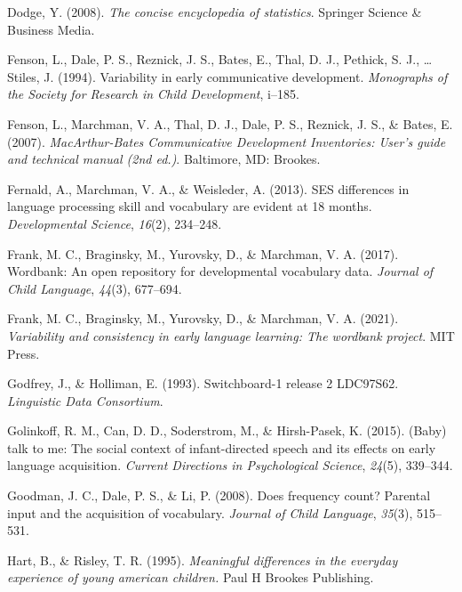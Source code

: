 \documentclass[10pt, letterpaper]{article}
\newenvironment{CSLReferences}%
  {}%
  {\par}
\begin{document}
\begin{CSLReferences}{1}{0}
\leavevmode{}%
Dodge, Y. (2008). \emph{The concise encyclopedia of statistics}.
Springer Science \& Business Media.

\leavevmode{}%
Fenson, L., Dale, P. S., Reznick, J. S., Bates, E., Thal, D. J.,
Pethick, S. J., \ldots{} Stiles, J. (1994). Variability in early
communicative development. \emph{Monographs of the Society for Research
in Child Development}, i--185.

\leavevmode{}%
Fenson, L., Marchman, V. A., Thal, D. J., Dale, P. S., Reznick, J. S.,
\& Bates, E. (2007). \emph{{M}ac{A}rthur-{B}ates {C}ommunicative
{D}evelopment {I}nventories: User's guide and technical manual (2nd
ed.)}. Baltimore, MD: Brookes.

\leavevmode{}%
Fernald, A., Marchman, V. A., \& Weisleder, A. (2013). SES differences
in language processing skill and vocabulary are evident at 18 months.
\emph{Developmental Science}, \emph{16}(2), 234--248.

\leavevmode{}%
Frank, M. C., Braginsky, M., Yurovsky, D., \& Marchman, V. A. (2017).
Wordbank: An open repository for developmental vocabulary data.
\emph{Journal of Child Language}, \emph{44}(3), 677--694.

\leavevmode{}%
Frank, M. C., Braginsky, M., Yurovsky, D., \& Marchman, V. A. (2021).
\emph{Variability and consistency in early language learning: The
wordbank project}. MIT Press.

\leavevmode{}%
Godfrey, J., \& Holliman, E. (1993). Switchboard-1 release 2 LDC97S62.
\emph{Linguistic Data Consortium}.

\leavevmode{}%
Golinkoff, R. M., Can, D. D., Soderstrom, M., \& Hirsh-Pasek, K. (2015).
(Baby) talk to me: The social context of infant-directed speech and its
effects on early language acquisition. \emph{Current Directions in
Psychological Science}, \emph{24}(5), 339--344.

\leavevmode{}%
Goodman, J. C., Dale, P. S., \& Li, P. (2008). Does frequency count?
Parental input and the acquisition of vocabulary. \emph{Journal of Child
Language}, \emph{35}(3), 515--531.

\leavevmode{}%
Hart, B., \& Risley, T. R. (1995). \emph{Meaningful differences in the
everyday experience of young american children.} Paul H Brookes
Publishing.


\end{CSLReferences}
\end{document}

